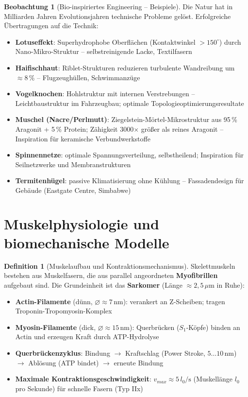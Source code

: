 ﻿\documentclass[a4paper,12pt]{report}
\theoremstyle{definition}
\newtheorem{definition}{Definition}
\newtheorem{beobachtung}{Beobachtung}
\begin{document}
\begin{beobachtung}[Bio-inspiriertes Engineering -- Beispiele]
Die Natur hat in Milliarden Jahren Evolutionsjahren technische Probleme gelöst.
Erfolgreiche Übertragungen auf die Technik:
\begin{itemize}
    \item[-] \textbf{Lotuseffekt}: Superhydrophobe Oberflächen (Kontaktwinkel $> 150^\circ$)
          durch Nano-Mikro-Struktur -- selbstreinigende Lacke, Textilfasern
    \item[-] \textbf{Haifischhaut}: Riblet-Strukturen reduzieren turbulente
          Wandreibung um $\approx 8\,\%$ -- Flugzeughüllen, Schwimmanzüge
    \item[-] \textbf{Vogelknochen}: Hohlstruktur mit internen Verstrebungen --
          Leichtbaustruktur im Fahrzeugbau; optimale Topologieoptimierungsresultate
    \item[-] \textbf{Muschel (Nacre/Perlmutt)}: Ziegelstein-Mörtel-Mikrostruktur
          aus 95\,\% Aragonit + 5\,\% Protein; Zähigkeit 3000$\times$ größer als
          reines Aragonit -- Inspiration für keramische Verbundwerkstoffe
    \item[-] \textbf{Spinnennetze}: optimale Spannungsverteilung, selbstheilend;
          Inspiration für Seilnetzwerke und Membranstrukturen
    \item[-] \textbf{Termitenhügel}: passive Klimatisierung ohne Kühlung --
          Fassadendesign für Gebäude (Eastgate Centre, Simbabwe)
\end{itemize}
\end{beobachtung}


\section{Muskelphysiologie und biomechanische Modelle}

\begin{definition}[Muskelaufbau und Kontraktionsmechanismus]
Skelettmuskeln bestehen aus Muskelfasern, die aus parallel angeordneten
\textbf{Myofibrillen} aufgebaut sind. Die Grundeinheit ist das \textbf{Sarkomer}
(Länge $\approx 2{,}5\,\mu\mathrm{m}$ in Ruhe):
\begin{itemize}
    \item[-] \textbf{Actin-Filamente} (dünn, $\varnothing \approx 7\,\mathrm{nm}$):
          verankert an Z-Scheiben; tragen Troponin-Tropomyosin-Komplex
    \item[-] \textbf{Myosin-Filamente} (dick, $\varnothing \approx 15\,\mathrm{nm}$):
          Querbrücken ($S_1$-Köpfe) binden an Actin und erzeugen Kraft durch ATP-Hydrolyse
    \item[-] \textbf{Querbrückenzyklus}: Bindung $\to$ Kraftschlag (Power Stroke, $5\ldots10\,\mathrm{nm}$)
          $\to$ Ablösung (ATP bindet) $\to$ erneute Bindung
    \item[-] \textbf{Maximale Kontraktionsgeschwindigkeit}: $v_{max} \approx 5\,l_0/\mathrm{s}$
          (Muskellänge $l_0$ pro Sekunde) für schnelle Fasern (Typ IIx)
\end{itemize}
\end{definition}
\end{document}
